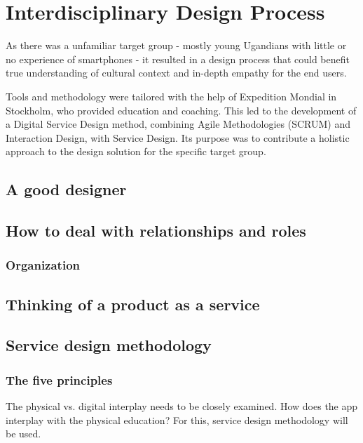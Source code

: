 \section{Interdisciplinary Design Process}

As there was a unfamiliar target group - mostly young Ugandians with little or no experience of smartphones - it resulted in a design process that could benefit true understanding of cultural context and in-depth empathy for the end users.

Tools and methodology were tailored with the help of Expedition Mondial in Stockholm, who provided education and coaching. This led to the development of a Digital Service Design method, combining Agile Methodologies (SCRUM) and Interaction Design, with Service Design. Its purpose was to contribute a holistic approach to the design solution for the specific target group. \cite{nissar-linkedin}

\subsection{A good designer}

\subsection{How to deal with relationships and roles}

\subsubsection{Organization}

\subsection{Thinking of a product as a service}

\subsection{Service design methodology}

\subsubsection{The five principles}

The physical vs. digital interplay needs to be closely examined. How does the app interplay with the physical education? For this, service design methodology will be used.

